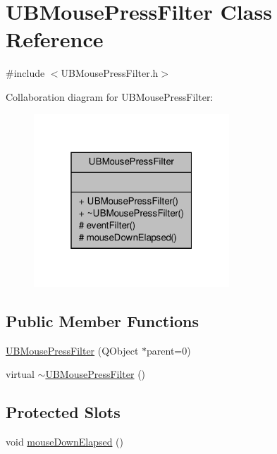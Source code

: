 \hypertarget{class_u_b_mouse_press_filter}{\section{U\-B\-Mouse\-Press\-Filter Class Reference}
\label{d8/d58/class_u_b_mouse_press_filter}
}


{\ttfamily \#include $<$U\-B\-Mouse\-Press\-Filter.\-h$>$}



Collaboration diagram for U\-B\-Mouse\-Press\-Filter\-:
\nopagebreak
\begin{figure}[H]
\begin{center}
\leavevmode
\includegraphics[width=208pt]{d7/d9f/class_u_b_mouse_press_filter__coll__graph}
\end{center}
\end{figure}
\subsection*{Public Member Functions}
\begin{DoxyCompactItemize}
\item 
\hyperlink{class_u_b_mouse_press_filter_a32d8b1f6367f51018e79255f3c011319}{U\-B\-Mouse\-Press\-Filter} (Q\-Object $\ast$parent=0)
\item 
virtual \hyperlink{class_u_b_mouse_press_filter_a839c05ef6fc484ac8b7c39679aa0ed3e}{$\sim$\-U\-B\-Mouse\-Press\-Filter} ()
\end{DoxyCompactItemize}
\subsection*{Protected Slots}
\begin{DoxyCompactItemize}
\item 
void \hyperlink{class_u_b_mouse_press_filter_a4090719a1987b4e640c6cf0402bf1b6f}{mouse\-Down\-Elapsed} ()
\end{DoxyCompactItemize}
